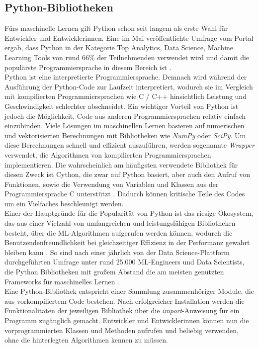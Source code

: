 \documentclass[german,bachelor]{swsLeipzig}
\begin{document}
\subsection{Python-Bibliotheken}
Fürs maschinelle Lernen gilt Python schon seit langem als erste Wahl für Entwickler und Entwicklerinnen.
Eine im Mai \citeyear{nugget} veröffentlichte Umfrage vom Portal \citeauthor{nugget} ergab, dass Python in der Kategorie
\glqq Top Analytics, Data Science, Machine Learning Tools\grqq{} von rund 66\% der Teilnehmenden verwendet wird
und damit die populärste Programmiersprache in diesem Bereich ist \cite[]{nugget}. \\
\indent Python ist eine interpretierte Programmiersprache.
Demnach wird während der Ausführung der Python-Code zur Laufzeit interpretiert, wodurch sie im Vergleich mit kompilierten
Programmiersprachen wie C / C++ hinsichtlich Leistung und Geschwindigkeit schlechter abschneidet.
Ein wichtiger Vorteil von Python ist jedoch die Möglichkeit, Code aus anderen Programmiersprachen relativ einfach einzubinden.
Viele Lösungen im maschinellen Lernen basieren auf numerischen und vektorisierten Berechnungen mit Bibliotheken
wie \textit{NumPy} oder \textit{SciPy}.
Um diese Berechnungen schnell und effizient auszuführen, werden sogenannte \textit{Wrapper} verwendet,
die Algorithmen von kompilierten Programmiersprachen implementieren.
Die wahrscheinlich am häufigsten verwendete Bibliothek für diesen Zweck ist Cython, die zwar auf Python basiert,
aber auch den Aufruf von Funktionen, sowie die Verwendung von Variablen und Klassen aus der Programmiersprache C unterstützt \cite[]{8757088}.
Dadurch können kritische Teile des Codes um ein Vielfaches beschleunigt werden. \\
\indent Einer der Hauptgründe für die Popularität von Python ist das riesige Ökosystem, das aus einer Vielzahl
von umfangreichen und leistungsfähigen Bibliotheken besteht, über die ML-Algorithmen aufgerufen werden können,
wodurch die Benutzendenfreundlichkeit bei gleichzeitiger Effizienz in der Performanz gewahrt bleiben kann \cite[]{2020}.
So sind nach einer jährlich von der Data Science-Plattform \citeauthor{kaggle} durchgeführten Umfrage unter rund 25.000 ML-Engineers
und Data Scientists, die Python Bibliotheken mit großem Abstand die am meisten genutzten Frameworks für maschinelles Lernen \cite[]{kaggle}.\\
\indent Eine Python-Bibliothek entspricht einer Sammlung zusammenhöriger Module, die aus vorkompiliertem Code bestehen.
Nach erfolgreicher Installation werden die Funktionalitäten der jeweiligen Bibliothek über die \textit{import}-Anweisung für ein Programm zugänglich
gemacht.
Entwickler und Entwicklerinnen können nun die vorprogrammierten Klassen und Methoden aufrufen und beliebig verwenden,
ohne die hinterlegten Algorithmen kennen zu müssen.
\end{document}
